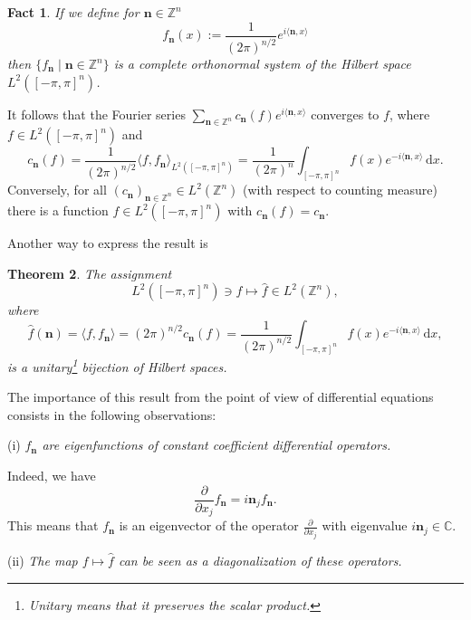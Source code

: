 \documentclass[12pt, oneside, a4paper]{article}
\newtheorem{thm}{Theorem}[section]
\newtheorem{fact}[thm]{Fact}
\def\nbf{\mathbf{n}}
\theoremstyle{dfn}
\newcommand{\scalprod}[2]{\langle #1,#2 \rangle}
\providecommand{\Lpern}[1]{L^{#1}([-\pi,\pi]^n)}
\def\Zbb{\ensuremath{\mathbb{Z}}}
\def\dx{\,\mathrm dx}
\newcommand{\Com}{\mathbb{C}}
\begin{document}
\begin{fact} If we define for $\nbf \in \Zbb^n$
\[
f_\nbf(x) := \frac{1}{(2\pi)^{n/2}} e^{i \scalprod{\nbf}{x}}
\]
then $\{ f_\nbf \mid \nbf \in \Zbb^n \}$ is a complete orthonormal system of the Hilbert space $\Lpern{2}$.
\end{fact}

It follows that the Fourier series $\sum_{\nbf \in \Zbb^n} c_\nbf(f) e^{i \scalprod{\nbf}{x}}$ converges to $f$, where $f \in \Lpern{2}$ and
\[
c_\nbf(f) = \frac{1}{(2\pi)^{n/2}} \scalprod{f}{f_\nbf}_{\Lpern{2}} = \frac{1}{(2\pi)^n} \int_{[-\pi,\pi]^n} f(x) e^{-i \scalprod{\nbf}{x}} \dx.
\]
Conversely, for all $(c_\nbf)_{\nbf \in \Zbb^n} \in L^2(\Zbb^n)$ (with respect to counting measure) there is a function $f \in \Lpern{2}$ with $c_\nbf(f) = c_\nbf$.

Another way to express the result is

\begin{thm}
The assignment
\[
\Lpern{2} \ni f \mapsto \widehat{f} \in L^2(\Zbb^n),
\]
where
\[
\widehat{f}(\nbf) = \scalprod{f}{f_\nbf} = (2\pi)^{n/2} c_\nbf(f) = \frac{1}{(2\pi)^{n/2}} \int_{[-\pi,\pi]^n} f(x) e^{-i \scalprod{\nbf}{x}} \dx,
\]
is a unitary\footnote{Unitary means that it preserves the scalar product.} bijection of Hilbert spaces.
\end{thm}

The importance of this result from the point of view of differential equations consists in the following observations:

(i) \textsl{$f_\nbf$ are eigenfunctions of constant coefficient differential operators.}

Indeed, we have
\[
\frac{\partial}{\partial x_j} f_\nbf = i \nbf_j f_\nbf.
\]
This means that $f_\nbf$ is an eigenvector of the operator $\frac{\partial}{\partial x_j}$ with eigenvalue $i \nbf_j \in \Com$.

(ii) \textsl{The map $f \mapsto \widehat{f}$ can be seen as a diagonalization of these operators.}


\end{document}
